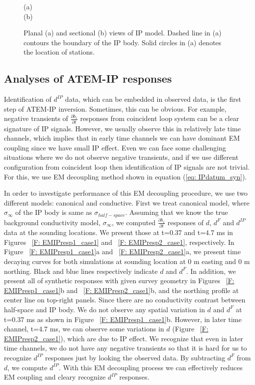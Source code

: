 \documentclass[a4paper, 11pt]{article}
\newcommand{\siginf}{\sigma_\infty}
\begin{document}
\begin{figure}[htb]
  \centering
  (a) \\
  (b)
  \caption{Planal (a) and sectional (b) views of IP model. Dashed line in (a) contours the boundary of the IP body. Solid circles in (a) denotes the location of stations.}
  \label{F: IPModel}
\end{figure}
\clearpage

\subsection{Analyses of ATEM-IP responses}
Identification of $d^{IP}$ data, which can be embedded in observed data, is the first step of ATEM-IP inversion. Sometimes, this can be obvious. For example, negative transients of $\frac{\partial b_z}{\partial t}$ responses from coincident loop system can be a clear signature of IP signals. However, we usually observe this in relatively late time channels, which implies that in early time channels we can have dominant EM coupling since we have small IP effect. Even we can face some challenging situations where we do not observe negative transients, and if we use different configuration from coincident loop then identification of IP signals are not trivial. For this, we use EM decoupling method shown in equation (\ref{eq: IPdatum_syn}).

In order to investigate performance of this EM decoupling procedure, we use two different models: canonical and conductive. First we treat canonical model, where $\siginf$ of the IP body is same as $\sigma_{half-space}$. Assuming that we know the true background conductivity model, $\siginf$, we computed $\frac{\partial b_z}{\partial t}$ responses of $d$, $d^F$ and $d^{IP}$ data at the sounding locations. We present those at t=0.37 and t=4.7 ms in Figures ~\ref{F: EMIPresp1_case1} and ~\ref{F: EMIPresp2_case1}, respectively. In Figure ~\ref{F: EMIPresp1_case1}a and ~\ref{F: EMIPresp2_case1}a, we present time decaying curves for both simulations at sounding location at 0 m  easting  and 0 m northing. Black and blue lines respectively indicate $d$ and $d^F$. In addition, we present all of synthetic responses with given survey geometry in Figures ~\ref{F: EMIPresp1_case1}b and ~\ref{F: EMIPresp2_case1}b, and the northing profile at center line on top-right panels. Since there are no conductivity contrast between half-space and IP body. We do not observe any spatial variation in $d$ and $d^F$ at t=0.37 ms as shown in Figure ~\ref{F: EMIPresp1_case1}b. However, in later time channel, t=4.7 ms, we can observe some variations in $d$ (Figure ~\ref{F: EMIPresp2_case1}), which are due to IP effect. We recognize that even in later time channels, we do not have any negative transients so that it is hard for us to recognize $d^{IP}$ responses just by looking the observed data. By subtracting $d^F$ from $d$, we compute $d^{IP}$. With this EM decoupling process we can effectively reduces EM coupling and cleary recognize $d^{IP}$ responses.
\end{document}
